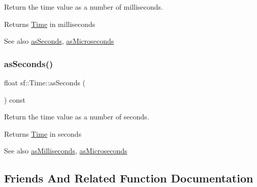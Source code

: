 Return the time value as a number of milliseconds. 

\begin{DoxyReturn}{Returns}
\mbox{\hyperlink{classsf_1_1_time}{Time}} in milliseconds
\end{DoxyReturn}
\begin{DoxySeeAlso}{See also}
\mbox{\hyperlink{classsf_1_1_time_aa3df2f992d0b0041b4eb02258d43f0e3}{as\+Seconds}}, \mbox{\hyperlink{classsf_1_1_time_a000c2c64b74658ebd228b9294a464275}{as\+Microseconds}} \begin{DoxyVerb}\end{DoxyVerb}
 
\end{DoxySeeAlso}
\mbox{\label{classsf_1_1_time_aa3df2f992d0b0041b4eb02258d43f0e3}} 
\subsubsection{\texorpdfstring{asSeconds()}{asSeconds()}}
{\footnotesize\ttfamily float sf\+::\+Time\+::as\+Seconds (\begin{DoxyParamCaption}{ }\end{DoxyParamCaption}) const}



Return the time value as a number of seconds. 

\begin{DoxyReturn}{Returns}
\mbox{\hyperlink{classsf_1_1_time}{Time}} in seconds
\end{DoxyReturn}
\begin{DoxySeeAlso}{See also}
\mbox{\hyperlink{classsf_1_1_time_aa16858ca030a07eb18958c321f256e5a}{as\+Milliseconds}}, \mbox{\hyperlink{classsf_1_1_time_a000c2c64b74658ebd228b9294a464275}{as\+Microseconds}} \begin{DoxyVerb}\end{DoxyVerb}
 
\end{DoxySeeAlso}


\subsection{Friends And Related Function Documentation}
\mbox{\label{classsf_1_1_time_a951fd7219641f1e8191887f5dfe0dc31}} 
